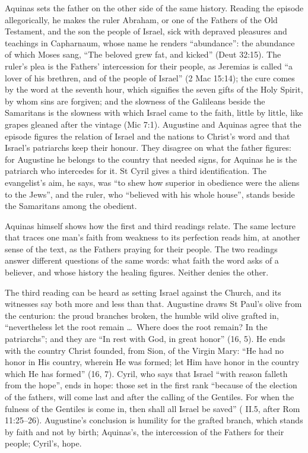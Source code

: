 Aquinas sets the father on the other side of the same history. Reading the
episode allegorically, he makes the ruler Abraham, or one of the Fathers of the
Old Testament, and the son the people of Israel, sick with depraved pleasures
and teachings in Capharnaum, whose name he renders ``abundance'': the abundance
of which Moses sang, ``The beloved grew fat, and kicked'' (Deut 32:15). The
ruler's plea is the Fathers' intercession for their people, as Jeremias is
called ``a lover of his brethren, and of the people of Israel'' (2 Mac 15:14);
the cure comes by the word at the seventh hour, which signifies the seven gifts
of the Holy Spirit, by whom sins are forgiven; and the slowness of the
Galileans beside the Samaritans is the slowness with which Israel came to the
faith, little by little, like grapes gleaned after the vintage (Mic 7:1).
Augustine and Aquinas agree that the episode figures the relation of Israel and
the nations to Christ's word and that Israel's patriarchs keep their honour.
They disagree on what the father figures: for Augustine he belongs to the
country that needed signs, for Aquinas he is the patriarch who intercedes for
it. St Cyril gives a third identification. The evangelist's aim, he says, was
``to shew how superior in obedience were the aliens to the Jews'', and the
ruler, who ``believed with his whole house'', stands beside the Samaritans
among the obedient.

Aquinas himself shows how the first and third readings relate. The same
lecture that traces one man's faith from weakness to its perfection reads him,
at another sense of the text, as the Fathers praying for their people. The two
readings answer different questions of the same words: what faith the word
asks of a believer, and whose history the healing figures. Neither denies the
other.

The third reading can be heard as setting Israel against the Church, and its
witnesses say both more and less than that. Augustine draws St Paul's olive
from the centurion: the proud branches broken, the humble wild olive grafted
in, ``nevertheless let the root remain \dots\ Where does the root remain? In
the patriarchs''; and they are ``In rest with God, in great honor'' (16, 5). He
ends with the country Christ founded, from Sion, of the Virgin Mary: ``He had
no honor in His country, wherein He was formed; let Him have honor in the
country which He has formed'' (16, 7). Cyril, who says that Israel ``with
reason falleth from the hope'', ends in hope: those set in the first rank ``because of the election of the
fathers, will come last and after the calling of the Gentiles. For when the
fulness of the Gentiles is come in, then shall all Israel be saved''
( II.5, after Rom 11:25--26). Augustine's conclusion is humility for the grafted branch,
which stands by faith and not by birth; Aquinas's, the intercession of the
Fathers for their people; Cyril's, hope.


